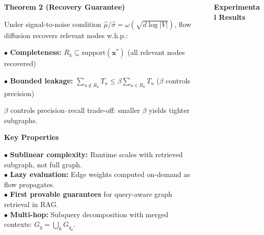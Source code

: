 \documentclass[final]{beamer}
\newlength{\sepwid}
\newlength{\colB}\setlength{\colB}{0.29\paperwidth}   %
\newlength{\colC}\setlength{\colC}{0.26\paperwidth}   %
\newcommand{\bx}{\mathbf{x}}
\begin{document}
\begin{frame}[t]
\begin{columns}[t]
\begin{column}{\colB}
\begin{alertblock}{\Large\textbf{Theorem 2 (Recovery Guarantee)}}

Under signal-to-noise condition $\hat{\mu}/\hat{\sigma} = \omega(\sqrt{d\log|V|})$, flow diffusion recovers relevant nodes w.h.p.:

\vspace{0.5em}
$\bullet$ \textbf{Completeness:} $R_k \subseteq \mathrm{support}(\bx^*)$ \hfill {\small(all relevant nodes recovered)}

\vspace{0.3em}
$\bullet$ \textbf{Bounded leakage:} $\displaystyle\sum_{u \notin R_k} T_u \leq \beta \sum_{u \in R_k} T_u$ \hfill {\small($\beta$ controls precision)}

\vspace{0.3em}
$\beta$ controls precision--recall trade-off: smaller $\beta$ yields tighter subgraphs.

\end{alertblock}


\begin{block}{\Large\textbf{\color{samsungblue} Key Properties}}

\colorbox{sectionbg}{\parbox{0.95\linewidth}{%
$\bullet$ \textbf{Sublinear complexity:} Runtime scales with retrieved subgraph, not full graph.\\[5pt]
$\bullet$ \textbf{Lazy evaluation:} Edge weights computed on-demand as flow propagates.\\[5pt]
$\bullet$ \textbf{First provable guarantees} for query-aware graph retrieval in RAG.\\[5pt]
$\bullet$ \textbf{Multi-hop:} Subquery decomposition with merged contexts: $G_q = \bigcup_{k} G_{q_k}$.
}}

\end{block}

\end{column}

\begin{column}{\sepwid}\end{column}

\begin{column}{\colC}

\vspace{-1cm}

\begin{block}{\Large\textbf{\color{samsungblue} Experimental Results}}


\end{block}
\end{column}
\end{columns}
\end{frame}
\end{document}
